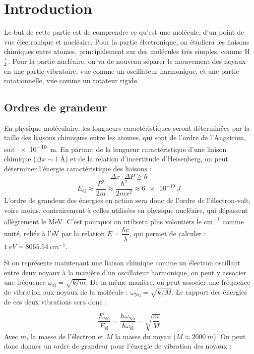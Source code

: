 ﻿


\section{Introduction}


Le but de cette partie est de comprendre ce qu'est une molécule, d'un point de vue électronique et nucléaire. Pour la partie électronique, on étudiera les liaisons chimiques entre atomes, principalement sur des molécules très simples, comme H$^+_2$. Pour la partie nucléaire, on va de nouveau séparer le mouvement des noyaux en une partie vibratoire, vue comme un oscillateur harmonique, et une partie rotationnelle, vue comme un rotateur rigide.


\subsection{Ordres de grandeur}


En physique moléculaire, les longueurs caractéristiques seront déterminées par la taille des liaisons chimiques entre les atomes, qui sont de l'ordre de l'Ångström, soit \SI{e-10}{m}. En partant de la longueur caractéristique d'une liaison chimique ($\Delta x \sim \SI{1}{\angstrom}$) et de la relation d'incertitude d'Heisenberg, on peut déterminer l'énergie caractéristique des liaisons :
\[
    \Delta x\cdot \Delta P \geq \hbar
\]
\[
    E_\text{el} \approx \dfrac{P^2}{2m} \approx \dfrac{\hbar ^2}{2mx^2} \approx \SI{6e-19}{J}
\]
L'ordre de grandeur des énergies en action sera donc de l'ordre de l'électron-volt, voire moins, contrairement à celles utilisées en physique nucléaire, qui dépassent allègrement le \si{MeV}. C'est pourquoi on utilisera plus volontiers le \si{cm^{-1}} comme unité, reliée à l'\si{eV} par la relation $E = \dfrac{\hbar c}{\lambda}$, qui permet de calculer : $\SI{1}{eV} = \SI{8065.54}{cm^{-1}}$.


Si on représente maintenant une liaison chimique comme un électron oscillant entre deux noyaux à la manière d'un oscillateur harmonique, on peut y associer une fréquence $\omega_\text{el} = \sqrt{k/m}$. De la même manière, on peut associer une fréquence de vibration aux noyaux de la molécule : $\omega_\text{Nu} = \sqrt{k/M}$. Le rapport des énergies de ces deux vibrations sera donc :


\[
    \dfrac{E_\text{Nu}}{E_\text{el}} = \dfrac{\hbar \omega_\text{Nu}}{\hbar\omega_\text{el}} = \sqrt{\dfrac{m}{M}}
\]
Avec $m$, la masse de l'électron et $M$ la masse du noyau ($M \approx \SI{2000}{m}$). On peut donc donner un ordre de grandeur pour l'énergie de vibration des noyaux :


